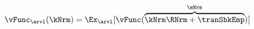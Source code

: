   \begin{equation}\begin{gathered}\begin{aligned}
        \vFunc_{\arvl}(\kNrm) & = \Ex_{\arvl}[\vFunc(\overbrace{\kNrm \RNrm + \tranShkEmp}^{\mNrm})]  \label{eq:vBegStg}
      \end{aligned}\end{gathered}\end{equation}
